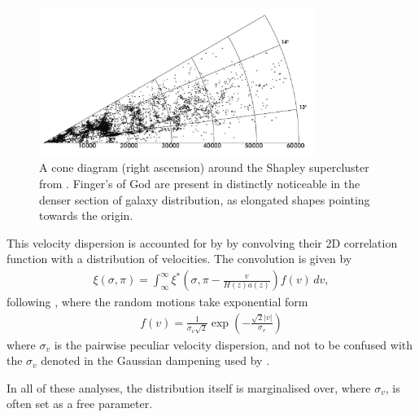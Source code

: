 \documentclass[titlesmallcaps, examinerscopy, copyrightpage]{uqthesis}
\newcommand\abs[1]{\left|#1\right|}
\newcommand{\red}{\color{red}}
\begin{document}
\begin{figure}[h!]
  \begin{center}
    \includegraphics[width=0.8\textwidth]{images/fingerOfGod.jpg}
  \end{center}
  \caption{A cone diagram (right ascension) around the Shapley supercluster from \citet{ProustQuintana2006}. Finger's of God are present in distinctly noticeable in the denser section of galaxy distribution, as elongated shapes pointing towards the origin.}
  \label{fig:fingersOfGod}
\end{figure}

This velocity dispersion is accounted for by \citet{ChuangWang2012} by convolving their 2D correlation function with a distribution of velocities. The convolution is given by
\begin{align}
\xi(\sigma, \pi) = \int_\infty^\infty \xi^* \left(\sigma, \pi - \frac{v}{H(z) a(z)} \right) f(v)\, dv,
\end{align} 
following \citet{Peebles1980}, where the random motions take exponential form \citep{RatcliffeShanks1998,Landy2002}
\begin{align}
f(v) = \frac{1}{\sigma_v \sqrt{2}} \exp\left(- \frac{\sqrt{2}\abs{v}}{\sigma_v} \right)
\end{align}
where $\sigma_v$ is the pairwise peculiar velocity dispersion, and not to be confused with the $\sigma_v$ denoted in the Gaussian dampening used by \citet{BlakeDavis2011}.

In all of these analyses, the distribution itself is marginalised over, where $\sigma_v$, is often set as a free parameter.

\end{document}
